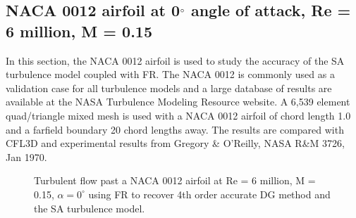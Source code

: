 \graphicspath{{figures_RANS_naca0012/}}%

\subsection{NACA 0012 airfoil at 0$^{\circ}$ angle of attack, Re = 6 million, M = 0.15}
In this section, the NACA 0012 airfoil is used to study the accuracy of the SA turbulence model coupled with FR. The NACA 0012 is commonly used as a validation case for all turbulence models and a large database of results are available at the NASA Turbulence Modeling Resource website. A 6,539 element quad/triangle mixed mesh is used with a NACA 0012 airfoil of chord length 1.0 and a farfield boundary 20 chord lengths away. The results are compared with CFL3D and experimental results from Gregory \& O'Reilly, NASA R\&M 3726, Jan 1970.

\begin{figure}
  \begin{subfigmatrix}{2}
  \end{subfigmatrix}
  \caption{Turbulent flow past a NACA 0012 airfoil at Re = 6 million, M = 0.15, $\alpha = 0^{\circ}$ using FR to recover 4th order accurate DG method and the SA turbulence model.}
  \label{RANS_naca0012}
\end{figure}


